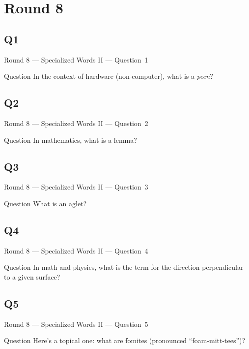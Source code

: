 \documentclass[11pt]{beamer}
\begin{document}
\section{Round 8}
\subsection*{Q1}
\begin{frame}[t]{Round 8 --- Specialized Words II --- \mbox{Question 1}}
    \vspace{-0.5em}
    \begin{block}{Question}
        In the context of hardware (non-computer), what is a \emph{peen}?
    \end{block}
\end{frame}
\subsection*{Q2}
\begin{frame}[t]{Round 8 --- Specialized Words II --- \mbox{Question 2}}
    \vspace{-0.5em}
    \begin{block}{Question}
        In mathematics, what is a lemma?
    \end{block}
\end{frame}
\subsection*{Q3}
\begin{frame}[t]{Round 8 --- Specialized Words II --- \mbox{Question 3}}
    \vspace{-0.5em}
    \begin{block}{Question}
        What is an aglet?
    \end{block}
\end{frame}
\subsection*{Q4}
\begin{frame}[t]{Round 8 --- Specialized Words II --- \mbox{Question 4}}
    \vspace{-0.5em}
    \begin{block}{Question}
        In math and physics, what is the term for the direction perpendicular to a given surface?
    \end{block}
\end{frame}
\subsection*{Q5}
\begin{frame}[t]{Round 8 --- Specialized Words II --- \mbox{Question 5}}
    \vspace{-0.5em}
    \begin{block}{Question}
        Here's a topical one: what are fomites (pronounced ``foam-mitt-tees'')?
    \end{block}
\end{frame}
\end{document}

